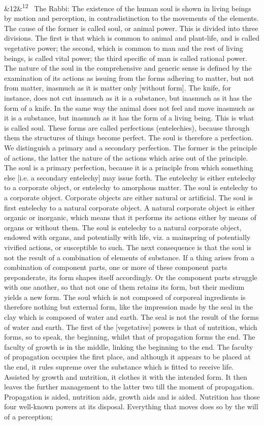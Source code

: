 \documentclass[12pt]{article}
\newcommand{\para}[1][]{\par\noindent\ifx&#1&\else\textsuperscript{\footnotesize #1}~\fi}
\begin{document}
\para[12] The Rabbi: The existence of the human soul is shown in living beings by motion and perception, in contradistinction to the movements of the elements. The cause of the former is called soul, or animal power. This is divided into three divisions. The first is that which is common to animal and plant-life, and is called vegetative power; the second, which is common to man and the rest of living beings, is called vital power; the third specific of man is called rational power. The nature of the soul in the comprehensive and generic sense is defined by the examination of its actions as issuing from the forms adhering to matter, but not from matter, inasmuch as it is matter only [without form]. The knife, for instance, does not cut inasmuch as it is a substance, but inasmuch as it has the form of a knife. In the same way the animal does not feel and move inasmuch as it is a substance, but inasmuch as it has the form of a living being. This is what is called soul. These forms are called perfections (entelechies), because through them the structures of things become perfect. The soul is therefore a perfection. We distinguish a primary and a secondary perfection. The former is the principle of actions, the latter the nature of the actions which arise out of the principle. The soul is a primary perfection, because it is a principle from which something else [i.e. a secondary entelechy] may issue forth. The entelechy is either entelechy to a corporate object, or entelechy to amorphous matter. The soul is entelechy to a corporate object. Corporate objects are either natural or artificial. The soul is first entelechy to a natural corporate object. A natural corporate object is either organic or inorganic, which means that it performs its actions either by means of organs or without them. The soul is entelechy to a natural corporate object, endowed with organs, and potentially with life, viz. a mainspring of potentially vivified actions, or susceptible to such. The next consequence is that the soul is not the result of a combination of elements of substance. If a thing arises from a combination of component parts, one or more of these component parts preponderate, its form shapes itself accordingly. Or the component parts struggle with one another, so that not one of them retains its form, but their medium yields a new form. The soul which is not composed of corporeal ingredients is therefore nothing but external form, like the impression made by the seal in the clay which is composed of water and earth. The seal is not the result of the forms of water and earth. The first of the [vegetative] powers is that of nutrition, which forms, so to speak, the beginning, whilst that of propagation forms the end. The faculty of growth is in the middle, linking the beginning to the end. The faculty of propagation occupies the first place, and although it appears to be placed at the end, it rules supreme over the substance which is fitted to receive life. Assisted by growth and nutrition, it clothes it with the intended form. It then leaves the further management to the latter two till the moment of propagation. Propagation is aided, nutrition aids, growth aids and is aided. Nutrition has those four well-known powers at its disposal. Everything that moves does so by the will of a perception; 
\end{document}
